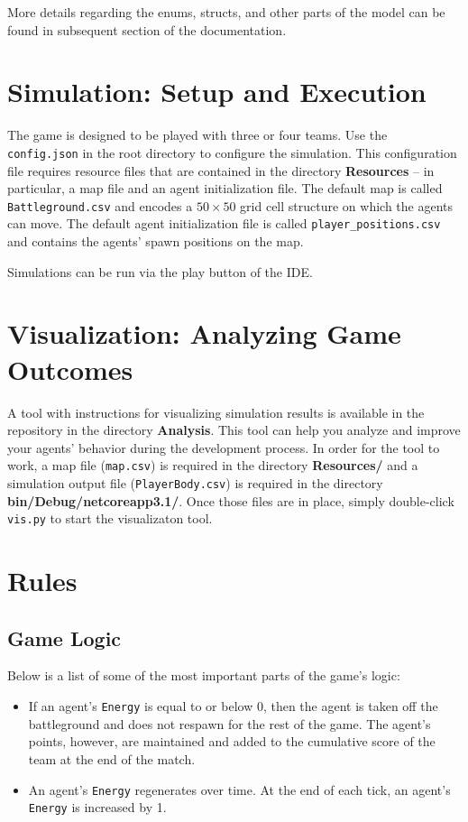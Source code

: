 \documentclass[
    a4paper,
    english,
    DIV=16,
    11pt,
    parskip=half,
    listof=totoc,		%
    index=totoc,		%
    bibliography=totoc,	%
]{scrartcl}
\begin{document}
More details regarding the enums, structs, and other parts of the model can be found in subsequent section of the documentation.

\section{Simulation: Setup and Execution}
\label{simSetup}

The game is designed to be played with three or four teams. Use the \texttt{config.json} in the root directory to configure the simulation. This configuration file requires resource files that are contained in the directory \textbf{Resources} -- in particular, a map file and an agent initialization file. The default map is called \texttt{Battleground.csv} and encodes a $50\times 50$ grid cell structure on which the agents can move. The default agent initialization file is called \texttt{player\_positions.csv} and contains the agents' spawn positions on the map.

Simulations can be run via the play button of the IDE.

\section{Visualization: Analyzing Game Outcomes}
A tool with instructions for visualizing simulation results is available in the repository in the directory \textbf{Analysis}. This tool can help you analyze and improve your agents' behavior during the development process. In order for the tool to work, a map file (\texttt{map.csv}) is required in the directory \textbf{Resources/} and a simulation output file (\texttt{PlayerBody.csv}) is required in the directory \textbf{bin/Debug/netcoreapp3.1/}. Once those files are in place, simply double-click \texttt{vis.py} to start the visualizaton tool.


\section{Rules} \label{rules}

\subsection{Game Logic}
Below is a list of some of the most important parts of the game's logic:

\begin{itemize}
    \item If an agent's \texttt{Energy} is equal to or below 0, then the agent is taken off the battleground and does not respawn for the rest of the game. The agent's points, however, are maintained and added to the cumulative score of the team at the end of the match.
    \item An agent's \texttt{Energy} regenerates over time. At the end of each tick, an agent's \texttt{Energy} is increased by 1.
\end{itemize}
\end{document}
